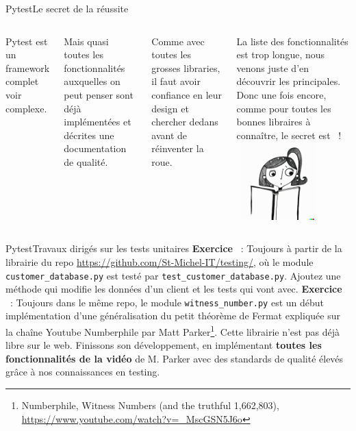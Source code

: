 \documentclass{beamer}
\begin{document}
    \begin{frame}{Pytest}{Le secret de la réussite}
        \transdissolve
        \begin{columns}
            Pytest est un framework complet voir complexe.

            Mais quasi toutes les fonctionnalités auxquelles on peut penser sont déjà implémentées et décrites une documentation de qualité.

            Comme avec toutes les grosses libraries, il faut avoir confiance en leur design et chercher dedans avant de réinventer la roue.

            La liste des fonctionnalités est trop longue, nous venons juste d'en découvrir les principales.
            \bigbreak
            Donc une fois encore, comme pour toutes les bonnes libraires à connaître, le secret est ~!
            \centering
            \includegraphics[width=3cm]{image/girl-rtfm}
        \end{columns}
    \end{frame}

    \begin{frame}{Pytest}{Travaux dirigés sur les tests unitaires}
        \transdissolve
        \textbf{Exercice \execcounterdispinc{}}~: Toujours à partir de la librairie du repo \url{https://github.com/St-Michel-IT/testing/}, où le module \lstinline{customer_database.py} est testé par \lstinline{test_customer_database.py}.
        Ajoutez une méthode qui modifie les données d'un client et les tests qui vont avec.
        \bigbreak
        \textbf{Exercice \execcounterdispinc{}}~: Toujours dans le même repo, le module \lstinline{witness_number.py} est un début implémentation d'une généralisation du petit théorème de Fermat expliquée sur la chaîne Youtube Numberphile par Matt Parker\footnote{Numberphile, Witness Numbers (and the truthful 1,662,803), \url{https://www.youtube.com/watch?v=_MscGSN5J6o}}.
        Cette librairie n'est pas déjà libre sur le web.
        Finissons son développement, en implémentant \textbf{toutes les fonctionnalités de la vidéo} de M. Parker avec des standards de qualité élevés grâce à nos connaissances en testing.
    \end{frame}
\end{document}
